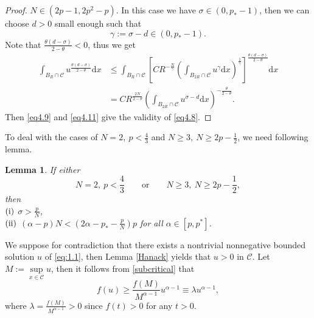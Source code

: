 \documentclass[12pt]{amsart}
\newtheorem{lem}[thm]{Lemma}
\theoremstyle{definition}
\theoremstyle{remark}
\theoremstyle{conclusion}
\theoremstyle{conjecture}
\numberwithin{equation}{section}
\begin{document}
\begin{proof}
\smallskip

 $N\in(2p-1,2p^2-p)$. In this case we have $\sigma\in(0,p_*-1)$, then we can choose $d>0$ small enough such that
$$\gamma:=\sigma-d\in(0,p_*-1).$$
Note that $\frac{\theta(d-\sigma)}{2-\theta}<0$, thus we get
\begin{equation}\label{eq4.11}
  \begin{aligned}
    \int_{B_R\cap\mathcal{C}}u^{\frac{\theta(d-\sigma)}{2-\theta}}\mathrm{d}x
  &\leq\int_{B_{R}\cap\mathcal{C}} \left[CR^{-\frac{N}{\gamma}}\left(\int_{B_{2R}\cap\mathcal{C}}u^{\gamma}\mathrm{d}x\right) ^{\frac{1}{\gamma}}\right] ^{\frac{\theta(d-\sigma)}{2-\theta}}\mathrm{d}x\\
  &=CR^{\frac{2N}{2-\theta}}\left(\int_{B_{2R}\cap\mathcal{C}}u^{\sigma-d}\mathrm{d}x\right) ^{-\frac{\theta}{2-\theta}}.
  \end{aligned}
\end{equation}
Then \eqref{eq4.9} and \eqref{eq4.11} give the validity of \eqref{eq4.8}.
\end{proof}
To deal with the cases of $N=2,\ p<\frac{4}{3}$ and $N\geq3,\ N\geq2p-\frac{1}{2}$, we need following lemma.
\begin{lem}\label{lem4.5}\cite[Lemma 3.4]{SZ}
If either
$$N=2,\ p<\frac{4}{3}\qquad\text{or}\qquad N\geq3,\ N\geq2p-\frac{1}{2},$$
then \\
$(\rm{i})$ $\sigma>\frac{p}{N}$,\\
$(\rm{ii})$ $(\alpha-p)N<(2\alpha-p_*-\frac{p}{N})p$ for all $\alpha\in[p,p^*]$.
\end{lem}
We suppose for contradiction that there exists a nontrivial nonnegative bounded solution $u$ of \eqref{eq:1.1}, then Lemma \ref{Hanack} yields that $u>0$ in $\mathcal{C}$.
Let $M:=\sup\limits_{x\in\mathcal{C}}u$, then it follows from \eqref{subcritical} that
\begin{equation}\label{eq f}
  f(u)\geq\frac{f(M)}{M^{\alpha-1}}u^{\alpha-1}\equiv\lambda u^{\alpha-1},
\end{equation}
where $\lambda=\frac{f(M)}{M^{\alpha-1}}>0$ since $f(t)>0$ for any $t>0$.
\end{document}
